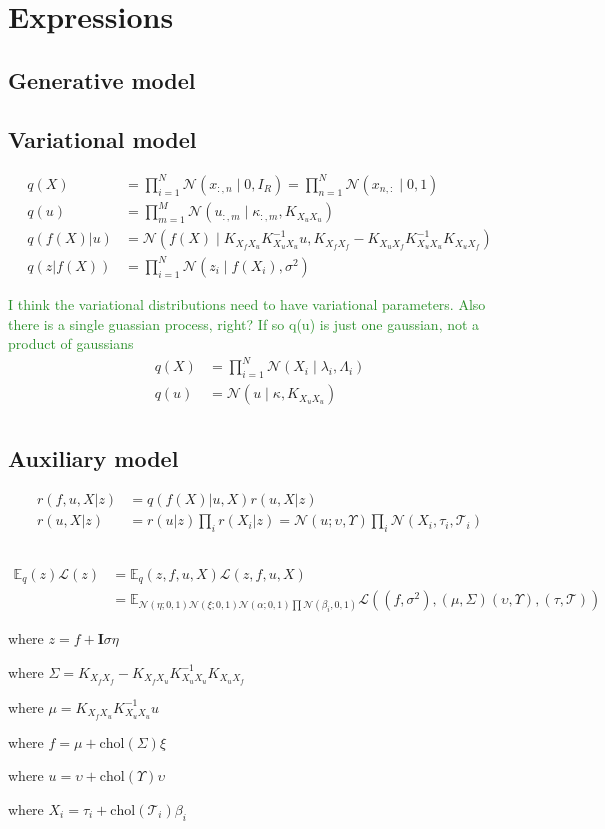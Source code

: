 \documentclass[12pt]{article}
\newcommand{\chris}[1]{\textcolor{ForestGreen}{#1}}
\newcommand{\Tau}{\mathcal{T}}
\newcommand{\Kff}{K_{X_fX_f}}
\newcommand{\Kuu}{K_{X_uX_u}}
\newcommand{\Kuf}{K_{X_uX_f}}
\newcommand{\Kfu}{K_{X_fX_u}}
\newcommand{\Ex}{\mathbb{E}}
\newcommand{\No}{\mathcal{N}}
\newcommand{\chol}{\mathrm{chol}}
\begin{document}
\section{Expressions}
\subsection{Generative model}
%


\subsection{Variational model}
%
\begin{align}
q(X) &= \prod_{i=1}^N \mathcal{N}(x_{:,n}\mid 0, I_R) = \prod_{n=1}^N \mathcal{N}(x_{n,:}\mid 0,1)
     \\
    q(u) &= \prod_{m=1}^M \mathcal{N}(u_{:,m}\mid \kappa_{:,m}, \Kuu)\\
    q(f(X)|u) &= \mathcal{N}(f(X)\mid \Kfu\Kuu^{-1}u, \Kff-\Kuf\Kuu^{-1}\Kuf)\\
    q(z|f(X)) &= \prod_{i=1}^N \mathcal{N}(z_i\mid f(X_i), \sigma^2)
\end{align}

\chris{I think the variational distributions need to have variational parameters. Also there is a single guassian process, right? If so q(u) is just one gaussian, not a product of gaussians}
\begin{align}
    q(X) &= \prod_{i=1}^N \mathcal{N}(X_i\mid \lambda_i, \Lambda_i)\\
    q(u) &= \mathcal{N}(u \mid \kappa, K_{X_uX_u})\\
\end{align}

\subsection{Auxiliary model}
%
\begin{align}
    r(f,u,X|z) &= q(f(X)|u,X)r(u,X|z)\\
    r(u,X|z) &= r(u| z) \prod_i r(X_i|z) = \mathcal{N}(u; \upsilon, \Upsilon ) \prod_i \mathcal{N}( X_i, \tau_i, \Tau_i )
\end{align}



\subsection{}

\begin{align}
\Ex_q(z) \mathcal{L}(z) &= \Ex_q(z,f,u,X) \mathcal{L}(z,f,u,X) \\
&= \Ex_{\No(\eta;0,1)\No(\xi;0,1)\No(\alpha;0,1)\prod\No(\beta_i,0,1)} \mathcal{L}((f,\sigma^2),(\mu,\Sigma)(\upsilon,\Upsilon),(\tau,\Tau))
\end{align}

where  $z = f + \mathbf{I}\sigma\eta $

where $\Sigma = \Kff - \Kfu\Kuu^{-1}\Kuf$

where $\mu   = \Kfu\Kuu^{-1}u$

where $f = \mu + \chol(\Sigma)\xi $

where $u = \upsilon + \chol(\Upsilon)\upsilon$

where $X_i = \tau_i + \chol(\Tau_i)\beta_i$


 
\end{document}
